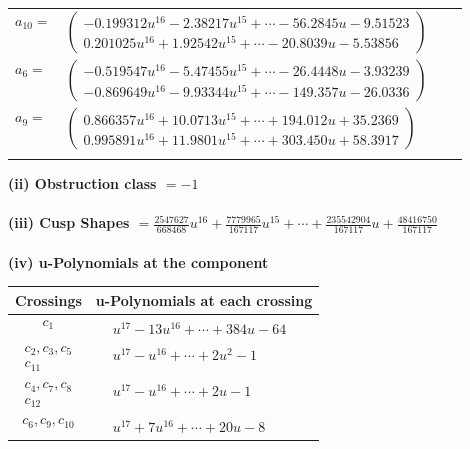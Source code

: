 \documentclass[1p]{elsarticle_modified}
\theoremstyle{definition}
\begin{document}
\begin{tabular}{m{7pt} m{180pt} m{7pt} m{180pt} }
\flushright $a_{10}=$&$\begin{pmatrix}-0.199312 u^{16}-2.38217 u^{15}+\cdots-56.2845 u-9.51523\\0.201025 u^{16}+1.92542 u^{15}+\cdots-20.8039 u-5.53856\end{pmatrix}$ \\
\flushright $a_{6}=$&$\begin{pmatrix}-0.519547 u^{16}-5.47455 u^{15}+\cdots-26.4448 u-3.93239\\-0.869649 u^{16}-9.93344 u^{15}+\cdots-149.357 u-26.0336\end{pmatrix}$ \\
\flushright $a_{9}=$&$\begin{pmatrix}0.866357 u^{16}+10.0713 u^{15}+\cdots+194.012 u+35.2369\\0.995891 u^{16}+11.9801 u^{15}+\cdots+303.450 u+58.3917\end{pmatrix}$\\&\end{tabular}
\flushleft \textbf{(ii) Obstruction class $= -1$}\\~\\
\flushleft \textbf{(iii) Cusp Shapes $= \frac{2547627}{668468} u^{16}+\frac{7779965}{167117} u^{15}+\cdots+\frac{235542904}{167117} u+\frac{48416750}{167117}$}\\~\\
\newpage\renewcommand{\arraystretch}{1}
\flushleft \textbf{(iv) u-Polynomials at the component}\newline \\
\begin{tabular}{m{50pt}|m{274pt}}
Crossings & \hspace{64pt}u-Polynomials at each crossing \\
\hline $$\begin{aligned}c_{1}\end{aligned}$$&$\begin{aligned}
&u^{17}-13 u^{16}+\cdots+384 u-64
\end{aligned}$\\
\hline $$\begin{aligned}c_{2},c_{3},c_{5}\\c_{11}\end{aligned}$$&$\begin{aligned}
&u^{17}- u^{16}+\cdots+2 u^2-1
\end{aligned}$\\
\hline $$\begin{aligned}c_{4},c_{7},c_{8}\\c_{12}\end{aligned}$$&$\begin{aligned}
&u^{17}- u^{16}+\cdots+2 u-1
\end{aligned}$\\
\hline $$\begin{aligned}c_{6},c_{9},c_{10}\end{aligned}$$&$\begin{aligned}
&u^{17}+7 u^{16}+\cdots+20 u-8
\end{aligned}$\\
\hline
\end{tabular}\\~\\
\end{document}
